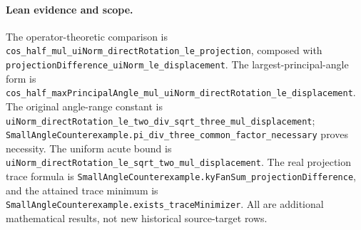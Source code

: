 \paragraph{Lean evidence and scope.}
The operator-theoretic comparison is
\texttt{cos\_half\_mul\_uiNorm\_directRotation\_le\_projection},
composed with
\texttt{projectionDifference\_uiNorm\_le\_displacement}.
The largest-principal-angle form is
\texttt{cos\_half\_maxPrincipalAngle\_mul\_uiNorm\_directRotation\_le\_displacement}.
The original angle-range constant is
\texttt{uiNorm\_directRotation\_le\_two\_div\_sqrt\_three\_mul\_displacement};
\texttt{SmallAngleCounterexample.pi\_div\_three\_common\_factor\_necessary}
proves necessity. The uniform acute bound is
\texttt{uiNorm\_directRotation\_le\_sqrt\_two\_mul\_displacement}.
The real projection trace formula is
\texttt{SmallAngleCounterexample.kyFanSum\_projectionDifference},
and the attained trace minimum is
\texttt{SmallAngleCounterexample.exists\_traceMinimizer}.
All are additional mathematical results, not new historical source-target rows.
